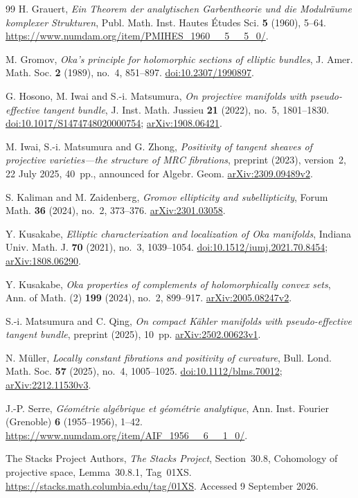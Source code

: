 \documentclass[12pt]{amsart}
\theoremstyle{definition}
\theoremstyle{remark}
\numberwithin{equation}{section}
\begin{document}
\begin{thebibliography}{99}
H. Grauert,
\emph{Ein Theorem der analytischen Garbentheorie und die Modulr\"aume komplexer Strukturen},
Publ. Math. Inst. Hautes \'Etudes Sci. \textbf{5} (1960), 5--64.
\url{https://www.numdam.org/item/PMIHES_1960__5__5_0/}.

M. Gromov, \emph{Oka's principle for holomorphic sections of elliptic bundles},
J. Amer. Math. Soc. \textbf{2} (1989), no.~4, 851--897.
\href{https://doi.org/10.2307/1990897}{doi:10.2307/1990897}.

G. Hosono, M. Iwai and S.-i. Matsumura,
\emph{On projective manifolds with pseudo-effective tangent bundle},
J. Inst. Math. Jussieu \textbf{21} (2022), no.~5, 1801--1830.
\href{https://doi.org/10.1017/S1474748020000754}{doi:10.1017/S1474748020000754};
\href{https://arxiv.org/abs/1908.06421}{arXiv:1908.06421}.

M. Iwai, S.-i. Matsumura and G. Zhong,
\emph{Positivity of tangent sheaves of projective varieties---the structure of MRC fibrations},
preprint (2023), version~2, 22 July 2025, 40~pp., announced for Algebr. Geom.
\href{https://arxiv.org/abs/2309.09489v2}{arXiv:2309.09489v2}.

S. Kaliman and M. Zaidenberg, \emph{Gromov ellipticity and subellipticity},
Forum Math. \textbf{36} (2024), no.~2, 373--376.
\href{https://arxiv.org/abs/2301.03058}{arXiv:2301.03058}.

Y. Kusakabe, \emph{Elliptic characterization and localization of Oka manifolds},
Indiana Univ. Math. J. \textbf{70} (2021), no.~3, 1039--1054.
\href{https://doi.org/10.1512/iumj.2021.70.8454}{doi:10.1512/iumj.2021.70.8454};
\href{https://arxiv.org/abs/1808.06290}{arXiv:1808.06290}.

Y. Kusakabe, \emph{Oka properties of complements of holomorphically convex sets},
Ann. of Math. (2) \textbf{199} (2024), no.~2, 899--917.
\href{https://arxiv.org/abs/2005.08247v2}{arXiv:2005.08247v2}.

S.-i. Matsumura and C. Qing,
\emph{On compact K\"ahler manifolds with pseudo-effective tangent bundle},
preprint (2025), 10~pp.
\href{https://arxiv.org/abs/2502.00623v1}{arXiv:2502.00623v1}.

N. M\"uller, \emph{Locally constant fibrations and positivity of curvature},
Bull. Lond. Math. Soc. \textbf{57} (2025), no.~4, 1005--1025.
\href{https://doi.org/10.1112/blms.70012}{doi:10.1112/blms.70012};
\href{https://arxiv.org/abs/2212.11530v3}{arXiv:2212.11530v3}.

J.-P. Serre, \emph{G\'eom\'etrie alg\'ebrique et g\'eom\'etrie analytique},
Ann. Inst. Fourier (Grenoble) \textbf{6} (1955--1956), 1--42.
\url{https://www.numdam.org/item/AIF_1956__6__1_0/}.

The Stacks Project Authors, \emph{The Stacks Project},
Section~30.8, Cohomology of projective space, Lemma~30.8.1, Tag~01XS.
\url{https://stacks.math.columbia.edu/tag/01XS}. Accessed 9 September 2026.

\end{thebibliography}
\end{document}
